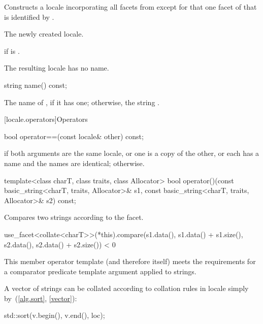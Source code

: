 \begin{itemdescr}
\pnum
\effects
Constructs a locale incorporating all facets from 
except for that one facet of  that is identified by .

\pnum
\returns
The newly created locale.

\pnum
\throws
{} if  is .

\pnum
\remarks
The resulting locale has no name.
\end{itemdescr}

%
\begin{itemdecl}
string name() const;
\end{itemdecl}

\begin{itemdescr}
\pnum
\returns
The name of , if it has one;
otherwise, the string .
\end{itemdescr}

[locale.operators]{Operators}

%
\begin{itemdecl}
bool operator==(const locale& other) const;
\end{itemdecl}

\begin{itemdescr}
\pnum
\returns
{} if
both arguments are the same locale, or
one is a copy of the other, or
each has a name and the names are identical;
 otherwise.
\end{itemdescr}

%
\begin{itemdecl}
template<class charT, class traits, class Allocator>
  bool operator()(const basic_string<charT, traits, Allocator>& s1,
                  const basic_string<charT, traits, Allocator>& s2) const;
\end{itemdecl}

\begin{itemdescr}
\pnum
\effects
Compares two strings according to the  facet.

\pnum
\returns
\begin{codeblock}
use_facet<collate<charT>>(*this).compare(s1.data(), s1.data() + s1.size(),
                                         s2.data(), s2.data() + s2.size()) < 0
\end{codeblock}

\pnum
\remarks
This member operator template (and therefore  itself)
meets the requirements for
a comparator predicate template argument applied to strings.

\pnum
\begin{example}
A vector of strings 
can be collated according to collation rules in locale 
simply by~(\ref{alg.sort}, \ref{vector}):

\begin{codeblock}
std::sort(v.begin(), v.end(), loc);
\end{codeblock}
\end{example}
\end{itemdescr}

